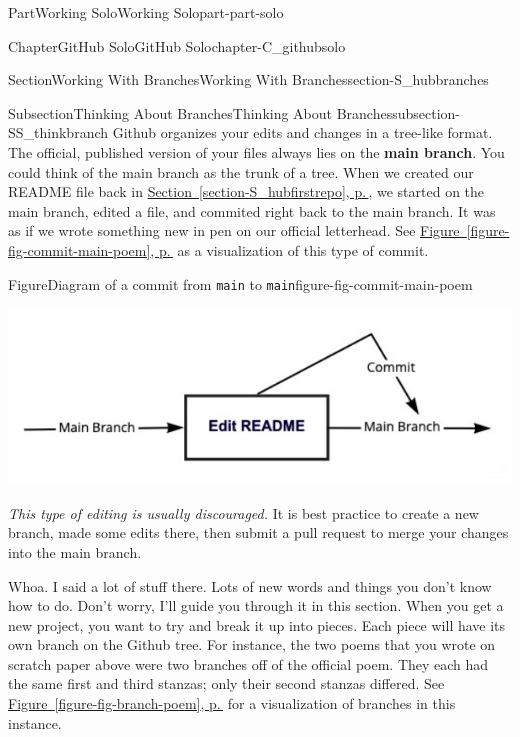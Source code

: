 \documentclass[twoside,10pt,]{book}
\newcommand{\xreffont}{\relax}
\newcommand{\mono}[1]{\texttt{#1}}
\newcommand{\terminology}[1]{\textbf{#1}}
\begin{document}
\begin{partptx}{Part}{Working Solo}{}{Working Solo}{}{}{part-part-solo}
\begin{chapterptx}{Chapter}{GitHub Solo}{}{GitHub Solo}{}{}{chapter-C_githubsolo}
\begin{sectionptx}{Section}{Working With Branches}{}{Working With Branches}{}{}{section-S_hubbranches}
\typeout{************************************************}
%
\begin{subsectionptx}{Subsection}{Thinking About Branches}{}{Thinking About Branches}{}{}{subsection-SS_thinkbranch}
%
%
Github organizes your edits and changes in a tree-like format. The official, published version of your files always lies on the \terminology{main branch}. You could think of the main branch as the trunk of a tree. When we created our README file back in \hyperref[section-S_hubfirstrepo]{Section~{\xreffont\ref{section-S_hubfirstrepo}}, p.\,\pageref{section-S_hubfirstrepo}}, we started on the main branch, edited a file, and commited right back to the main branch. It was as if we wrote something new in pen on our official letterhead. See \hyperref[figure-fig-commit-main-poem]{Figure~{\xreffont\ref{figure-fig-commit-main-poem}}, p.\,\pageref{figure-fig-commit-main-poem}} as a visualization of this type of commit.%
\begin{figureptx}{Figure}{Diagram of a commit from \mono{main} to \mono{main}}{figure-fig-commit-main-poem}{}%
\begin{image}{0.05}{0.9}{0.05}{}%
\includegraphics[width=\linewidth]{external/commit_main_poem.pdf}
\end{image}%
\tcblower
\end{figureptx}%
\emph{This type of editing is usually discouraged.} It is best practice to create a new branch, made some edits there, then submit a pull request to merge your changes into the main branch.%
\par
Whoa. I said a lot of stuff there. Lots of new words and things you don't know how to do. Don't worry, I'll guide you through it in this section. When you get a new project, you want to try and break it up into pieces. Each piece will have its own branch on the Github tree. For instance, the two poems that you wrote on scratch paper above were two branches off of the official poem. They each had the same first and third stanzas; only their second stanzas differed. See \hyperref[figure-fig-branch-poem]{Figure~{\xreffont\ref{figure-fig-branch-poem}}, p.\,\pageref{figure-fig-branch-poem}} for a visualization of branches in this instance.%

\end{subsectionptx}
\end{sectionptx}
\end{chapterptx}
\end{partptx}
\end{document}
